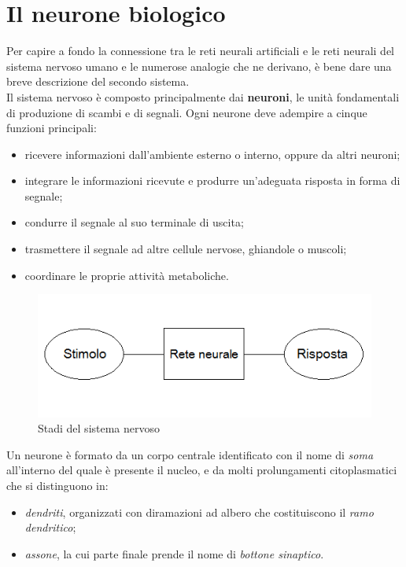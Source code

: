 \documentclass[12pt,a4paper,oneside]{book}
\begin{document}
		
		
	\section{Il neurone biologico}
		
		Per capire a fondo la connessione tra le reti neurali artificiali e le reti neurali del sistema nervoso umano e le numerose analogie che ne derivano, è bene dare una breve descrizione del secondo sistema.\\
  		Il sistema nervoso è composto principalmente dai \textbf{neuroni}, le unità fondamentali di produzione di scambi e di segnali. Ogni neurone deve adempire a cinque funzioni principali:
  		
  		\begin{itemize}
  			\item ricevere informazioni dall'ambiente esterno o interno, oppure da altri neuroni;
  			\item integrare le informazioni ricevute e produrre un'adeguata risposta in forma di segnale;
  			\item condurre il segnale al suo terminale di uscita;
  			\item trasmettere il segnale ad altre cellule nervose, ghiandole o muscoli;
  			\item coordinare le proprie attività metaboliche.
  		\end{itemize}
  	
  		\begin{figure}[h]
  			\centering
  			\includegraphics[width=0.8\linewidth]{IMMAGINI/Sistemanervoso}
  			\caption{Stadi del sistema nervoso}
  			\label{fig: stadi sistema nervoso}
  		\end{figure}
		
		Un neurone è formato da un corpo centrale identificato con il nome di \emph{soma} all'interno del quale è presente il nucleo, e da molti prolungamenti citoplasmatici che si distinguono in:
		 
		 \begin{itemize}
		 	\item \emph{dendriti}, organizzati con diramazioni ad albero che costituiscono il \emph{ramo dendritico};
		 	\item \emph{assone}, la cui parte finale prende il nome di \emph{bottone sinaptico}.
		 \end{itemize}
		 
\end{document}
